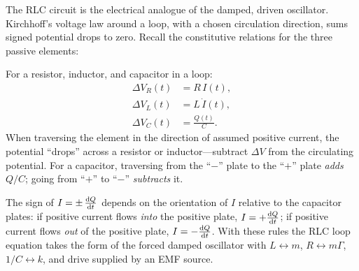 The RLC circuit is the electrical analogue of the damped, driven oscillator. Kirchhoff's voltage law around a loop, with a chosen circulation direction, sums signed potential drops to zero. Recall the constitutive relations for the three passive elements:
\begin{fact}
For a resistor, inductor, and capacitor in a loop:
\begin{align}
    \Delta V_R(t) &= R\,I(t), \\
    \Delta V_L(t) &= L\,\dot{I}(t), \\
    \Delta V_C(t) &= \frac{Q(t)}{C}.
\end{align}
When traversing the element in the direction of assumed positive current, the potential ``drops'' across a resistor or inductor---subtract $\Delta V$ from the circulating potential. For a capacitor, traversing from the ``$-$'' plate to the ``$+$'' plate \emph{adds} $Q/C$; going from ``$+$'' to ``$-$'' \emph{subtracts} it.
\end{fact}
The sign of $I = \pm\,\dv{Q}{t}$ depends on the orientation of $I$ relative to the capacitor plates: if positive current flows \emph{into} the positive plate, $I = +\dv{Q}{t}$; if positive current flows \emph{out} of the positive plate, $I = -\dv{Q}{t}$. With these rules the RLC loop equation takes the form of the forced damped oscillator with $L \leftrightarrow m$, $R \leftrightarrow m\Gamma$, $1/C \leftrightarrow k$, and drive supplied by an EMF source.
